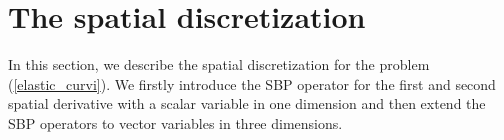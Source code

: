 \section{The spatial discretization}

In this section, we describe the spatial discretization for the problem (\ref{elastic_curvi}). We firstly introduce the SBP operator for the first and second spatial derivative with a scalar variable in one dimension and then extend the SBP operators to vector variables in three dimensions.